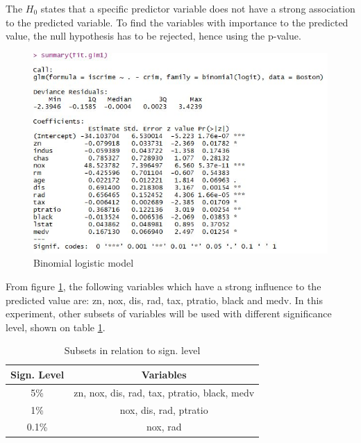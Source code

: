 The $H_0$ states that a specific predictor variable does not have a strong association to the predicted variable. To find the variables with importance to the predicted value, the null hypothesis has to be rejected, hence using the p-value.    


\begin{figure}[h]
\centering
\includegraphics[scale=0.6]{Graphics/Assignment1/LogisticRegressionCoefficientsExplore.JPG}
\caption{Binomial logistic model}
\label{fig:task_1_binomial_logistic_model}
\end{figure}

From figure \ref{fig:task_1_binomial_logistic_model}, the following variables which have a strong influence to the predicted value are: zn, nox, dis, rad, tax, ptratio, black and medv. In this experiment, other subsets of variables will be used with different significance level, shown on table \ref{table_subsets}.

\begin{table}[H]
\centering
\begin{tabular}{|c|c|}
\hline
Sign. Level & Variables                                     \\ \hline
5\%          & zn, nox, dis, rad, tax, ptratio, black, medv \\ \hline
1\%          & nox, dis, rad, ptratio                       \\ \hline
0.1\%        & nox, rad                                     \\ \hline
\end{tabular}
\caption{Subsets in relation to sign. level}
\label{table_subsets}
\end{table}

